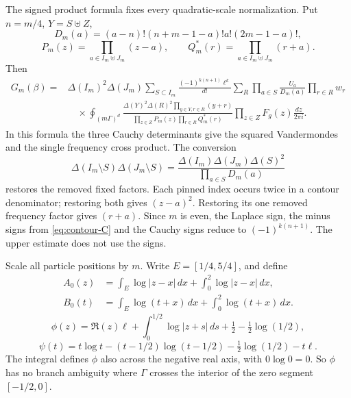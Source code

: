 The signed product formula fixes every quadratic-scale normalization. Put
\(n=m/4\), \(Y=S\uplus Z\),
\[
 D_m(a)=(a-n)!(n+m-1-a)!a!(2m-1-a)!,
\]
\[
 P_m(z)=\prod_{a\in I_m\uplus J_m}(z-a),\qquad
 Q_m^*(r)=\prod_{a\in I_m\uplus J_m}(r+a).
\]
Then
\begin{equation}\label{eq:contour-signed}
\begin{split}
 G_m(\beta)={}&\Delta(I_m)^2\Delta(J_m)
 \sum_{S\subset I_m}\frac{(-1)^{k(n+1)}\ell^k}{d!}
 \sum_R\prod_{a\in S}\frac{U_a}{D_m(a)}\prod_{r\in R}w_r\\
 &\quad\times\oint_{(m\Gamma)^d}
 \frac{\Delta(Y)^2\Delta(R)^2\prod_{y\in Y,r\in R}(y+r)}
      {\prod_{z\in Z}P_m(z)\prod_{r\in R}Q_m^*(r)}
                  \prod_{z\in Z}F_g(z)\frac{dz}{2\pi i}.
\end{split}
\end{equation}
In this formula the three Cauchy determinants give the squared
Vandermondes and the single frequency cross product. The conversion
\[
 \Delta(I_m\setminus S)\Delta(J_m\setminus S)
 =\frac{\Delta(I_m)\Delta(J_m)\Delta(S)^2}
              {\prod_{a\in S}D_m(a)}
\]
restores the removed fixed factors. Each pinned index occurs twice in a
contour denominator; restoring both gives \((z-a)^2\). Restoring its one
removed frequency factor gives \((r+a)\). Since \(m\) is even, the Laplace
sign, the minus signs from \eqref{eq:contour-C} and the Cauchy signs reduce
to \((-1)^{k(n+1)}\). The upper estimate does not use the signs.

Scale all particle positions by \(m\). Write \(E=[1/4,5/4]\), and define
\[
 \begin{aligned}
 A_0(z)&=\int_E\log|z-x|\,dx+\int_0^2\log|z-x|\,dx,\\
 B_0(t)&=\int_E\log(t+x)\,dx+\int_0^2\log(t+x)\,dx.
 \end{aligned}
\]
\[
 \phi(z)=\Re(z)\ell+\int_0^{1/2}\log|z+s|\,ds
                         +\tfrac12-\tfrac12\log(1/2),
\]
\begin{equation}\label{eq:contour-psi}
 \psi(t)=t\log t-(t-1/2)\log(t-1/2)
                           -\tfrac12\log(1/2)-t\ell.
\end{equation}
The integral defines \(\phi\) also across the negative real axis, with
\(0\log 0=0\). So \(\phi\) has no branch ambiguity where \(\Gamma\) crosses
the interior of the zero segment \([-1/2,0]\).

